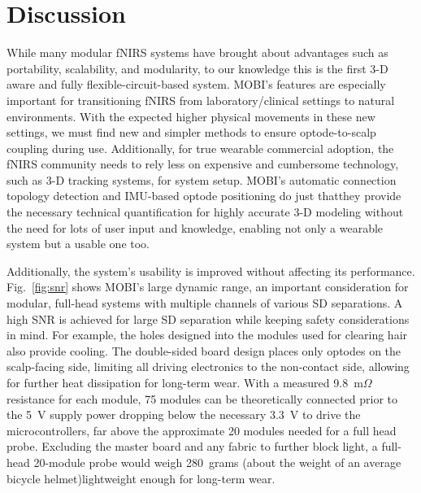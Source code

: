 \section{Discussion}
\label{chap:mobi:discussion}
While many modular \ac{fNIRS} systems have brought about advantages such as portability, scalability, and modularity, to our knowledge this is the first 3-D aware and fully flexible-circuit-based system. \ac{MOBI}'s features are especially important for transitioning \ac{fNIRS} from laboratory/clinical settings to natural environments. With the expected higher physical movements in these new settings, we must find new and simpler methods to ensure optode-to-scalp coupling during use. Additionally, for true wearable commercial adoption, the \ac{fNIRS} community needs to rely less on expensive and cumbersome technology, such as 3-D tracking systems, for system setup. \ac{MOBI}'s automatic connection topology detection and \ac{IMU}-based optode positioning do just that\textemdash they provide the necessary technical quantification for highly accurate 3-D modeling without the need for lots of user input and knowledge, enabling not only a wearable system but a usable one too. 

Additionally, the system's usability is improved without affecting its performance. Fig.~\ref{fig:snr} shows \ac{MOBI}'s large dynamic range, an important consideration for modular, full-head systems with multiple channels of various \ac{SD} separations. A high \ac{SNR} is achieved for large \ac{SD} separation while keeping safety considerations in mind. For example, the holes designed into the modules used for clearing hair also provide cooling. The double-sided board design places only optodes on the scalp-facing side, limiting all driving electronics to the non-contact side, allowing for further heat dissipation for long-term wear. With a measured 9.8~m$\Omega$ resistance for each module, 75 modules can be theoretically connected prior to the 5~V supply power dropping below the necessary 3.3~V to drive the microcontrollers, far above the approximate 20 modules needed for a full head probe. Excluding the master board and any fabric to further block light, a full-head 20-module probe would weigh 280~grams (about the weight of an average bicycle helmet)\textemdash lightweight enough for long-term wear. %

